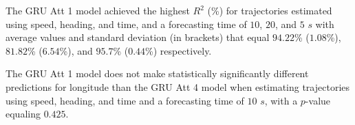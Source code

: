\begin{table}[!ht]
	\centering
	\caption{The average $R^{2}$ (\%), with standard deviation in brackets, across k-fold validation datasets for the trajectories in the k-fold testing datasets estimated using speed, heading, and time, different RNN models, and forecasting times.}
	\label{tab:best_speed_actual_dir_R2}
\end{table}

The GRU Att 1 model achieved the highest $R^{2}$ (\%) for trajectories estimated using speed, heading, and time, and a forecasting time of $10$, $20$, and $5$ $s$ with average values and standard deviation (in brackets) that equal $94.22$\% ($1.08$\%), $81.82$\% ($6.54$\%), and $95.7$\% ($0.44$\%) respectively.

The GRU Att 1 model does not make statistically significantly different predictions for longitude than the GRU Att 4 model when estimating trajectories using speed, heading, and time and a forecasting time of $10$ $s$, with a $p$-value equaling $0.425$.

